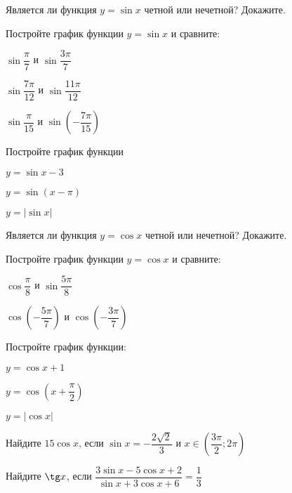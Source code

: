 %
%
\begin{consultation}
	\begin{listofex}
		\item Является ли функция \( y=\sin x \) четной или нечетной? Докажите.
		\item Постройте график функции \( y=\sin x \) и сравните:
		\begin{enumcols}[itemcolumns=3]
			\item \( \sin\dfrac{\pi}{7} \) и \( \sin\dfrac{3\pi}{7} \)
			\item \( \sin\dfrac{7\pi}{12} \) и \( \sin\dfrac{11\pi}{12} \)
			\item \( \sin\dfrac{\pi}{15} \) и \( \sin\left( -\dfrac{7\pi}{15} \right) \)
		\end{enumcols}
		\item Постройте график функции
		\begin{enumcols}[itemcolumns=3]
			\item \( y= \sin x - 3 \)
			\item \( y= \sin(x-\pi) \)
			\item \( y=|\sin x| \)
		\end{enumcols} 
		\item Является ли функция \( y=\cos x \) четной или нечетной? Докажите.
		\item Постройте график функции \( y=\cos x \) и сравните:
		\begin{enumcols}[itemcolumns=2]
			\item \( \cos\dfrac{\pi}{8} \) и \( \sin\dfrac{5\pi}{8} \)
			\item \( \cos\left( -\dfrac{5\pi}{7} \right) \) и \( \cos\left( -\dfrac{3\pi}{7} \right) \)
		\end{enumcols}
		\item Постройте график функции:
		\begin{enumcols}[itemcolumns=3]
			\item \( y=\cos x + 1 \)
			\item \( y=\cos\left( x+\dfrac{\pi}{2} \right) \)
			\item \( y=|\cos x| \)
		\end{enumcols}
		\item Найдите \( 15\cos x \), если \( \sin x = -\dfrac{2\sqrt{2}}{3} \) и \( x\in\left( \dfrac{3\pi}{2};2\pi \right) \)
		\item Найдите \( \tg x \), если \( \dfrac{3\sin x - 5\cos x + 2}{\sin x + 3\cos x + 6}=\dfrac{1}{3} \)
	\end{listofex}
\end{consultation}
